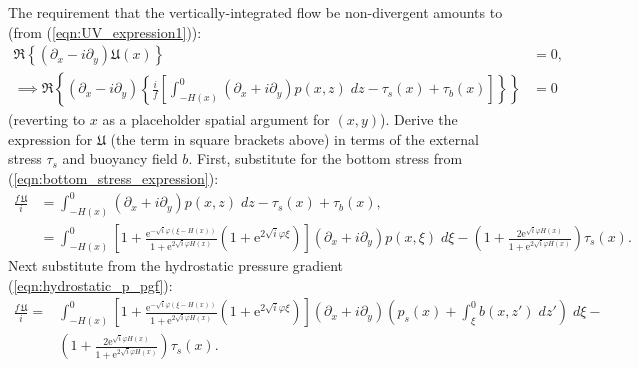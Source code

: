 \documentclass[10pt]{amsart}
\begin{document}

The requirement that the vertically-integrated flow be non-divergent amounts to (from (\ref{eqn:UV_expression1})):
\begin{align}
\Re \left\{ \left( \partial_x - i \partial_y \right) \mathfrak{U}(x) \right\} & = 0 , \nonumber \\
\implies \Re \left\{ \left( \partial_x - i \partial_y \right) \left\{\frac{i}{f} \left[
\int_{-H(x)}^{0} \left( \partial_x + i \partial_y \right) p(x,z) \; dz 
- \tau_s(x) + \tau_b (x) \right] \right\} \right\} &= 0  \nonumber
\end{align}
(reverting to $x$ as a placeholder spatial argument for $(x,y)$).
Derive the expression for $\mathfrak{U}$ (the term in square brackets above) in terms of the external stress $\tau_s$ and buoyancy field $b$.
First, substitute for the bottom stress from (\ref{eqn:bottom_stress_expression}):
\begin{align}
\frac{f \, \mathfrak{U}}{i}  & = \int_{-H(x)}^{0} \left( \partial_x + i \partial_y \right) p(x,z) \; dz 
- \tau_s(x) + \tau_b (x) ,  \nonumber \\
& = 
\int_{-H(x)}^{0} 
\left[ 1 +
\frac{ \mathrm{e}^{-\sqrt{i} \varphi (\xi - H(x))  } }{ 1 + \mathrm{e}^{2 \sqrt{i} \varphi H \left(x \right)} }
\left( 1 + \mathrm{e}^{2 \sqrt{i} \varphi \xi}\right) 
\right]
 \left( \partial_x + i \partial_y \right) p(x,\xi) \; d \xi   - \left( 1
+\frac{ 2 \mathrm{e}^{\sqrt{i} \varphi H(x)  } }{ 1 + \mathrm{e}^{2 \sqrt{i} \varphi H \left(x \right)} }
 \right) \tau_s(x)  \nonumber .
\end{align}
Next substitute from the hydrostatic pressure gradient (\ref{eqn:hydrostatic_p_pgf}):
\begin{align}
\frac{f \, \mathfrak{U}}{i} 
 = & 
\int_{-H(x)}^{0} 
\left[ 1 +
\frac{ \mathrm{e}^{-\sqrt{i} \varphi (\xi - H(x))  } }{ 1 + \mathrm{e}^{2 \sqrt{i} \varphi H \left(x \right)} }
\left( 1 + \mathrm{e}^{2 \sqrt{i} \varphi \xi}\right) 
\right]
 \left( \partial_x + i \partial_y \right) \left( p_s (x) + \int_{\xi}^{0} b(x,z') \; dz' \right)
 \; d \xi  -\nonumber \\
&   \left( 1
+\frac{ 2 \mathrm{e}^{\sqrt{i} \varphi H(x)  } }{ 1 + \mathrm{e}^{2 \sqrt{i} \varphi H \left(x \right)} }
 \right) \tau_s(x) . \nonumber
\end{align}
\end{document}
